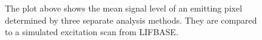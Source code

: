 \begin{figure}

\centering



\caption[Results of the excitation scan experiment]{The plot above shows the mean signal level of an emitting pixel determined by three separate analysis methods. They are compared to a simulated excitation scan from LIFBASE.}

\label{fig:excitationScanResults}

\end{figure}

